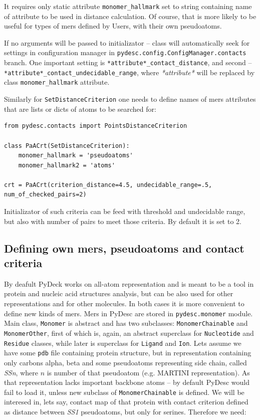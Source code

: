 \documentclass{article}
\begin{document}
It requires only static attribute \texttt{monomer\_{}hallmark} set to string containing name of attribute to be used in distance calculation. Of course, that is more likely to be useful for types of mers defined by Users, with their own pseudoatoms.

If no arguments will be passed to initializator -- class will automatically seek for settings in configuration manager in \texttt{pydesc.config.ConfigManager.contacts} branch. One important setting is \texttt{*attribute*\_contact\_distance}, and second -- \texttt{*attribute*\_contact\_undecidable\_range}, where \textit{*attribute*} will be replaced by class \texttt{monomer\_{}hallmark} attribute.

Similarly for \texttt{SetDistanceCriterion} one needs to define names of mers attributes that are lists or dicts of atoms to be searched for:

\begin{lstlisting}
from pydesc.contacts import PointsDistanceCriterion

class PaACrt(SetDistanceCriterion):
    monomer_hallmark = 'pseudoatoms'
    monomer_hallmark2 = 'atoms'

crt = PaACrt(criterion_distance=4.5, undecidable_range=.5, num_of_checked_pairs=2)
\end{lstlisting}

Initializator of such criteria can be feed with threshold and undecidable range, but also with number of pairs to meet those criteria. By default it is set to 2.

%
%
\subsection{Defining own mers, pseudoatoms and contact criteria}

By deafult PyDeck works on all-atom representation and is meant to be a tool in protein and nucleic acid structures analysis, but can be also used for other representations and for other molecules. In both cases it is more convenient to define new kinds of mers. Mers in PyDesc are stored in \texttt{pydesc.monomer} module. Main class, \texttt{Monomer} is abstract and has two subclasses: \texttt{MonomerChainable} and \texttt{MonomerOther}, first of which is, again, an abstract superclass for \texttt{Nucleotide} and \texttt{Residue} classes, while later is superclass for \texttt{Ligand} and \texttt{Ion}. Lets assume we have some \texttt{pdb} file containing protein structure, but in representation containing only carbons alpha, beta and some pseudoatoms representing side chain, called \textit{SSn}, where $n$ is number of that pseudoatom (e.g. MARTINI representation). As that representation lacks important backbone atoms -- by default PyDesc would fail to load it, unless new subclass of \texttt{MonomerChainable} is defined. We will be interesed in, lets say, contact map of that protein with contact criterion defined as distance between \textit{SS1} pseudoatoms, but only for serines. Therefore we need:
\end{document}
